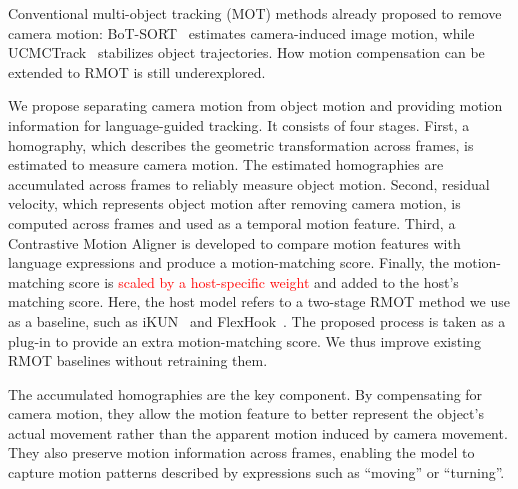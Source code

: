 \documentclass{article}
\begin{document}
Conventional multi-object tracking (MOT) methods already proposed to remove camera motion: BoT-SORT~\cite{botsort} estimates camera-induced image motion, while UCMCTrack~\cite{ucmctrack} stabilizes object trajectories. How motion compensation can be extended to RMOT is still underexplored.


We propose separating camera motion from object motion and providing motion information for language-guided tracking. It consists of four stages. First, a homography, which describes the geometric transformation across frames, is estimated to measure camera motion. The estimated homographies are accumulated across frames to reliably measure object motion. Second, residual velocity, which represents object motion after removing camera motion, is computed across frames and used as a temporal motion feature. Third, a Contrastive Motion Aligner is developed to compare motion features with language expressions and produce a motion-matching score. Finally, the motion-matching score is \textcolor{red}{scaled by a host-specific weight} and added to the host's matching score. Here, the host model refers to a two-stage RMOT method we use as a baseline, such as iKUN~\cite{ikun} and FlexHook~\cite{flexhook}. The proposed process is taken as a plug-in to provide an extra motion-matching score. We thus improve existing RMOT baselines without retraining them.

The accumulated homographies are the key component. By compensating for camera motion, they allow the motion feature to better represent the object's actual movement rather than the apparent motion induced by camera movement. They also preserve motion information across frames, enabling the model to capture motion patterns described by expressions such as \enquote{moving} or \enquote{turning}.
\end{document}
